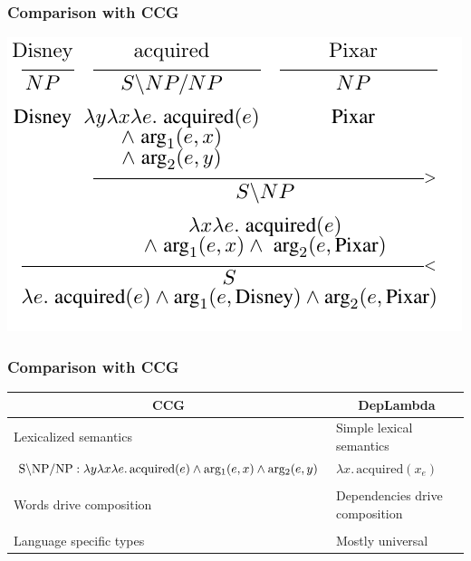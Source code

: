 \documentclass[mathserif,12pt]{beamer}
\newcommand{\hlight}[1]{{\color{blue!80} #1}}
\newcommand{\lx}{\lambda x }
\renewcommand{\land}{\wedge}
\newcommand{\lspace}{.\,}
\begin{document}
\begin{frame}  
\frametitle{Comparison with CCG}
\centering
\includegraphics[trim=0em 1em 1em 0em,clip=true,scale=1.2]{figures/ccg-transitive}
\end{frame}

\begin{frame}
\frametitle{Comparison with CCG}
\large
\vspace{-1em}
\begin{center}
\begin{tabular}{p{5.6cm}|p{5.6cm}}
 \multicolumn{1}{c|}{\hlight{CCG}} & \multicolumn{1}{c}{\hlight{DepLambda}} \\
 \midrule
 Lexicalized semantics & Simple lexical semantics \\
 \scriptsize $\hbox{S} \backslash \hbox{NP}/ \hbox{NP} : \lambda y \lambda x \lambda e \lspace \mathrm{acquired}(e) \land \mathrm{arg_1}(e, x) \land \mathrm{arg_2}(e, y)$  & \scriptsize $\lx \lspace \mathrm{acquired}(x_e)$ \\ 
\\
 Words drive composition & Dependencies drive composition \\
\\
 Language specific types & Mostly universal \\
 
\end{tabular}
\end{center}
\end{frame}
\end{document}
